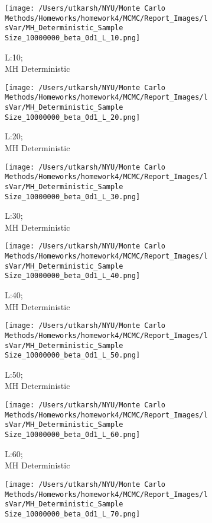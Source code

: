 \documentclass[11pt]{article}
\begin{document}
\begin{figure}[H]
	\centering
	\begin{subfigure}{.20\textwidth}
		\texttt{[image: /Users/utkarsh/NYU/Monte Carlo Methods/Homeworks/homework4/MCMC/Report\_Images/lsVar/MH\_Deterministic\_Sample Size\_10000000\_beta\_0d1\_L\_10.png]}
		\caption{L:10;\\MH Deterministic}
	\end{subfigure}
	\begin{subfigure}{.20\textwidth}
		\texttt{[image: /Users/utkarsh/NYU/Monte Carlo Methods/Homeworks/homework4/MCMC/Report\_Images/lsVar/MH\_Deterministic\_Sample Size\_10000000\_beta\_0d1\_L\_20.png]}
		\caption{L:20;\\MH Deterministic}
	\end{subfigure}
	\begin{subfigure}{.20\textwidth}
		\texttt{[image: /Users/utkarsh/NYU/Monte Carlo Methods/Homeworks/homework4/MCMC/Report\_Images/lsVar/MH\_Deterministic\_Sample Size\_10000000\_beta\_0d1\_L\_30.png]}
		\caption{L:30;\\MH Deterministic}
	\end{subfigure}
	\begin{subfigure}{.20\textwidth}
		\texttt{[image: /Users/utkarsh/NYU/Monte Carlo Methods/Homeworks/homework4/MCMC/Report\_Images/lsVar/MH\_Deterministic\_Sample Size\_10000000\_beta\_0d1\_L\_40.png]}
		\caption{L:40;\\MH Deterministic}
	\end{subfigure}
	\begin{subfigure}{.20\textwidth}
		\texttt{[image: /Users/utkarsh/NYU/Monte Carlo Methods/Homeworks/homework4/MCMC/Report\_Images/lsVar/MH\_Deterministic\_Sample Size\_10000000\_beta\_0d1\_L\_50.png]}
		\caption{L:50;\\MH Deterministic}
	\end{subfigure}
	\begin{subfigure}{.20\textwidth}
		\texttt{[image: /Users/utkarsh/NYU/Monte Carlo Methods/Homeworks/homework4/MCMC/Report\_Images/lsVar/MH\_Deterministic\_Sample Size\_10000000\_beta\_0d1\_L\_60.png]}
		\caption{L:60;\\MH Deterministic}
	\end{subfigure}
	\begin{subfigure}{.20\textwidth}
		\texttt{[image: /Users/utkarsh/NYU/Monte Carlo Methods/Homeworks/homework4/MCMC/Report\_Images/lsVar/MH\_Deterministic\_Sample Size\_10000000\_beta\_0d1\_L\_70.png]}

\end{subfigure}
\end{figure}
\end{document}
